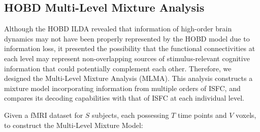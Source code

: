 \documentclass[11pt]{article}
\begin{document}
\subsection{HOBD Multi-Level Mixture Analysis}
Although the HOBD ILDA revealed that information of high-order brain dynamics may not have been properly represented by the HOBD model due to information loss, it presented the possibility that the functional connectivities at each level may represent non-overlapping sources of stimulus-relevant cognitive information that could potentially complement each other. Therefore, we designed the Multi-Level Mixture Analysis (MLMA). This analysis constructs a mixture model incorporating information from multiple orders of ISFC, and compares its decoding capabilities with that of ISFC at each individual level.

Given a fMRI dataset for $S$ subjects, each possessing $T$ time points and $V$ voxels, to construct the Multi-Level Mixture Model:
\end{document}
